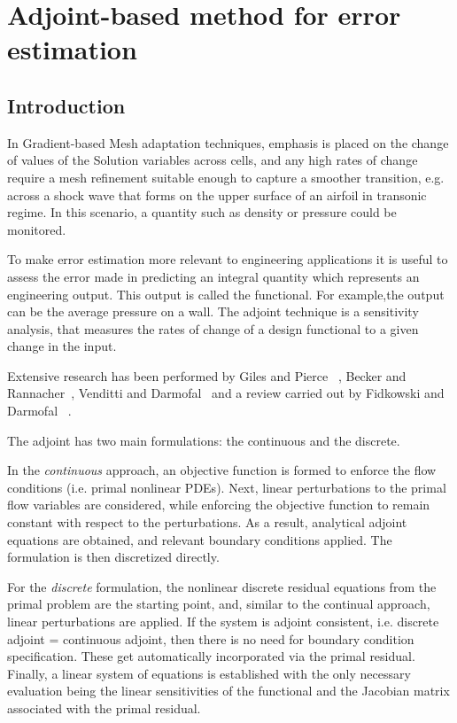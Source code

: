 \section{Adjoint-based method for error estimation}
\label{section:Adjoint}
\subsection{Introduction}

In Gradient-based Mesh adaptation techniques, emphasis is placed on the change of values of the Solution variables across cells, and any high rates of change require a mesh refinement suitable enough to capture a smoother transition, e.g. across a shock wave that forms on the upper surface of an airfoil in transonic regime. In this scenario, a quantity such as density or pressure could be monitored.\par

To make error estimation more relevant to engineering applications it is useful to assess the error made in predicting an integral quantity which represents an engineering output. This output is called the functional. For example,the output can be the average pressure on a wall. The adjoint technique is a sensitivity analysis, that measures the rates of change of a design functional to a given change in the input. \par

Extensive research has been performed by Giles and Pierce ~\cite{Giles:2000}, Becker and Rannacher~\cite{Becker:2001}, Venditti and Darmofal~\cite{Venditti:2000, Venditti:2002} and a review carried out by Fidkowski and Darmofal ~\cite{Fidkowski:2011}.

The adjoint has two main formulations: the continuous and the discrete.\par

In the \textit{continuous} approach, an objective function is formed to enforce the flow conditions (i.e. primal nonlinear PDEs). Next, linear perturbations to the primal flow variables are considered, while enforcing the objective function to remain constant with respect to the perturbations. As a result, analytical adjoint equations are obtained, and relevant boundary conditions applied. The formulation is then discretized directly. \par

For the \textit{discrete} formulation, the nonlinear discrete residual equations from the primal problem are the starting point, and, similar to the continual approach, linear perturbations are applied. If the system is adjoint consistent, i.e. discrete adjoint = continuous adjoint, then there is no need for boundary condition specification. These get automatically incorporated via the primal residual. Finally, a linear system of equations is established with the only necessary evaluation being the linear sensitivities of the functional and the Jacobian matrix associated with the primal residual. \par

